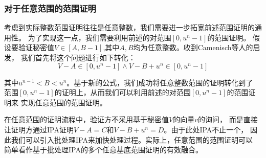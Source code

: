 \documentclass[zihao=-4]{ctexart}
\begin{document}
\begin{spacing}{1.5}
\subsubsection{对于任意范围的范围证明}
考虑到实际整数范围证明往往是任意整数，我们需要进一步拓宽前述范围证明的通用性。
为了实现这一点，我们需要利用前述的对范围$[0,u^n-1]$的范围证明。
假设要验证秘密值$V\in[A,B-1]$,其中$A,B$均为任意整数。收到Camenisch\cite{twelve}等人的启发，
我们首先将这个问题进行如下转化：
\begin{equation}V-A\in [0,u^n-1]\wedge V-B+u^n\in [0,u^n-1]\end{equation}\par
其中$u^{n-1}<B<u^n$。基于新的公式，我们成功将任意整数范围的证明转化到了
范围$[0,u^n-1]$的证明上，从而我们可以利用前述的对范围$[0,u^n-1]$的范围证明来
实现任意范围的范围证明。\par
在任意范围的证明流程中，验证方不采用基于秘密值$V$的向量$v$的询问，
而是直接让证明方通过IPA证明$V-A=C$和$V-B+u^n=D$。由于此处IPA不止一个，
因此我们可以引入批处理IPA来加快处理过程。实际上，任意范围的范围证明可以
简单看作基于批处理IPA的多个任意基底范围证明的有效融合。

\end{spacing}
\end{document}

